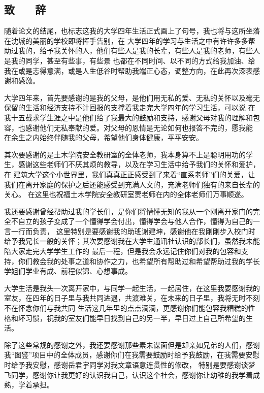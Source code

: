 \begin{center}
    \section*{  \textbf{致 ~~ 辞}}
    \end{center}

随着论文的结尾，也标志这我的大学四年生活正式画上了句号，我也将与这所坐落在沈城的美丽的学校即将挥手告别，在
大学四年的学习与生活之中有许许多多帮助过我的，给予我关怀的人，他们有些人是我的长辈，有些人是我的老师，有些人是我的同学，甚至有些事，有些景
也都在不同时间、以不同的方式给我加油、给我在或是志得意满，或是人生低谷时帮助我端正心态，调整方向，在此再次深表感谢和感激。

大学四年来，首先要感谢的是我的父母，是他们用无私的爱、无私的关怀以及毫无保留的生活和经济支持不计回报的支撑着我走完大学四年的学习生活，可以说
在我十五载求学生涯之中是他们给了我最大的鼓励和支持，感谢父母对我的理解和包容，也感谢他们无私奉献的爱。对父母的恩情是无论如何也报答不完的，愿我能
在余生之内始终伴随我的父母，希望他们身体健康，平平安安。

其次要感谢的是土木学院安全教研室的全体老师，我本身算不上是聪明用功的学生，感谢这些老师们不厌其烦的教导，以及在学习生活中给予我们的关怀和爱护，在
建筑大学这个小世界里，我们真真正正感受到了来着“直系老师”们的关爱，让我们在离开家庭的保护之后还能感受到充满人文的，充满老师们独有的来自长辈的关心。
在这里也祝福土木学院安全教研室贾老师在内的全体老师们万事顺遂。

我还要感谢曾经帮助过我的学长们，是你们将懵懂无知的我从一个刚离开家门的完全不自立的孩子变成了一个懂得学会付出，懂得学会与他人合作，懂得为自己的一言一行而负责，
这里特别是要感谢我的助班谢建坤，感谢他在我刚刚步入校门时给予我兄长一般的关怀；其次要感谢我在大学生通讯社认识的部长们，虽然我未能陪大家走完大学学生工作的
最后一程，但是我会永远记住你们对我的包容和支持，你们教会我的处事之道和协作之力，也希望所有帮助过和希望帮助过我的学长学姐们学业有成、前程似锦、心想事成。

大学生活是我头一次离开家中，与同学一起生活，一起居住，在这里我要感谢我的室友，在四年的日子里与我共同进退，共渡难关，在未来的日子里，我将无时不刻不在怀念你们与我共同
生活这几年里的点点滴滴，更感谢你们能包容我糟糕的性格和坏习惯，祝我的室友们能早日找到自己的另一半，早日过上自己所希望的生活。

除了这些常规的感谢之外，我还要感谢那些素未谋面但是却亲如兄弟的人们，感谢我“图鉴”项目中的全体成员，感谢你们在我需要鼓励时给予我鼓励，在我需要安慰时给予我安慰，感谢岳君宇同学对我文章语意连贯性的修改，
特别是要感谢谈梦飞同学，感谢你让我更好的认识我自己，认识这个社会，感谢你让幼稚的我学着成熟，学着承担。

